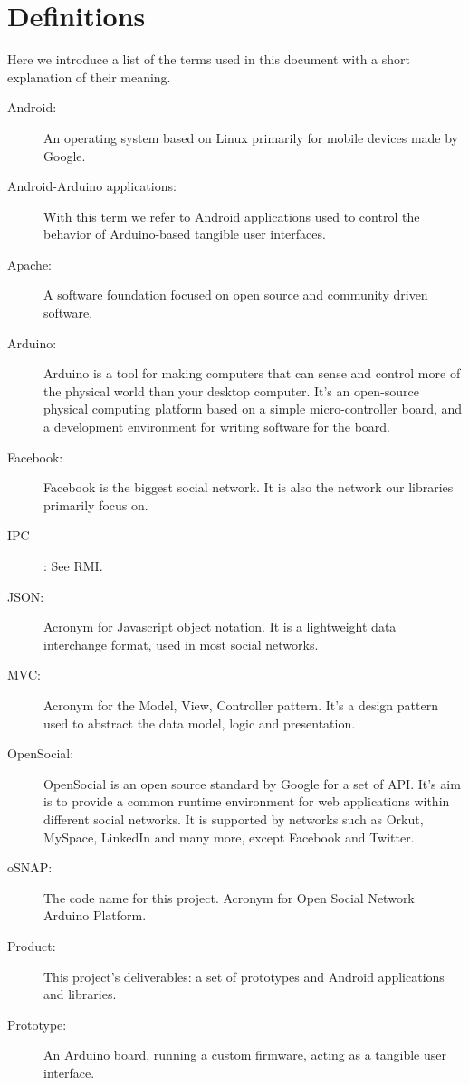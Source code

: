 \section{Definitions}

Here we introduce a list of the terms used in this document with a short explanation of their meaning.

\begin{description}

\item[Android:]
	An operating system based on Linux primarily for mobile devices made by Google.
\item[Android-Arduino applications:]
	With this term we refer to Android applications used to control the behavior of Arduino-based tangible user interfaces.
\item[Apache:]
	A software foundation focused on open source and community driven software.
\item[Arduino:]
	Arduino is a tool for making computers that can sense and control more of the physical world than your
	desktop computer. It's an open-source physical computing platform based on a simple micro-controller board, and a development
	environment for writing software for the board. 
\item[Facebook:]
	Facebook is the biggest social network. It is also the network our libraries primarily focus on.
\item[IPC]:
	See RMI.
\item[JSON:]
	Acronym for Javascript object notation. It is a lightweight data interchange format,
	used in most social networks.
\item[MVC:]
	Acronym for the Model, View, Controller pattern. It's a design pattern used to abstract the data model, logic and presentation.
\item[OpenSocial:]
	OpenSocial is an open source standard by Google for a set of API. It's aim is to
	provide a common runtime environment for web applications within different social networks. It is supported by networks
	such as Orkut, MySpace, LinkedIn and many more, except Facebook and Twitter.
\item[oSNAP:]
	The code name for this project. Acronym for Open Social Network Arduino Platform.
\item[Product:]
	This project's deliverables: a set of prototypes and Android applications and libraries.
\item[Prototype:]
	An Arduino board, running a custom firmware, acting as a tangible user interface.

\end{description}
